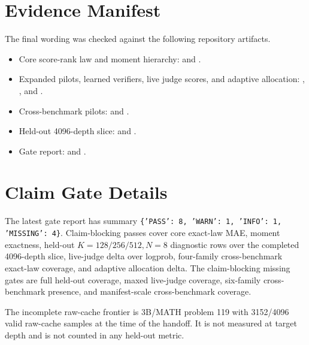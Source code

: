 \section{Evidence Manifest}
\label{app:evidence}

The final wording was checked against the following repository artifacts.

\begin{itemize}[leftmargin=*]
\item Core score-rank law and moment hierarchy:
 and
.
\item Expanded pilots, learned verifiers, live judge scores, and adaptive
allocation:
,
, and
.
\item Cross-benchmark pilots:
 and
.
\item Held-out 4096-depth slice:
 and
.
\item Gate report:
 and
.
\end{itemize}

\section{Claim Gate Details}
\label{app:gates}

The latest gate report has summary \texttt{\{'PASS': 8, 'WARN': 1,
'INFO': 1, 'MISSING': 4\}}. Claim-blocking passes cover core exact-law MAE,
moment exactness, held-out $K=128/256/512,N=8$ diagnostic rows over the
completed 4096-depth slice, live-judge delta over logprob, four-family
cross-benchmark exact-law coverage, and adaptive allocation delta. The
claim-blocking missing gates are full held-out coverage, maxed live-judge
coverage, six-family cross-benchmark presence, and manifest-scale
cross-benchmark coverage.

The incomplete raw-cache frontier is 3B/MATH problem 119 with 3152/4096 valid
raw-cache samples at the time of the handoff. It is not measured at target
depth and is not counted in any held-out metric.

